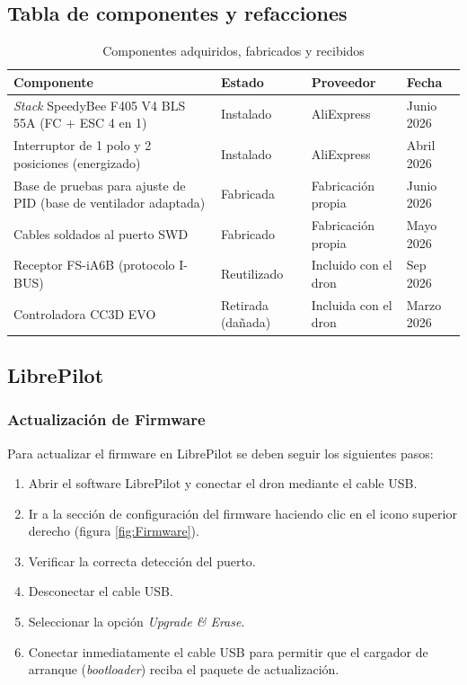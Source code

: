 \documentclass[pdflatex,sn-mathphys-num]{sn-jnl}%
\begin{document}
\subsection{Tabla de componentes y refacciones \label{sec:TablaComponentes}}
\begin{table}[!h]
\centering
\caption{Componentes adquiridos, fabricados y recibidos}
\label{tab:componentes}
\begin{tabular}{p{4.6cm}p{2.2cm}p{2.2cm}p{1.8cm}}
\hline
Componente & Estado & Proveedor  & Fecha \\
\hline
\textit{Stack} SpeedyBee F405 V4 BLS 55A (FC + ESC 4 en 1) & Instalado & AliExpress  & Junio 2026 \\
Interruptor de 1 polo y 2 posiciones (energizado) & Instalado   & AliExpress & Abril 2026 \\
Base de pruebas para ajuste de PID (base de ventilador adaptada) & Fabricada & Fabricación propia  & Junio 2026 \\
Cables soldados al puerto SWD & Fabricado & Fabricación propia  & Mayo 2026 \\
Receptor FS-iA6B (protocolo I-BUS) & Reutilizado & Incluido con el dron  & Sep 2026 \\
Controladora CC3D EVO & Retirada (dañada) & Incluida con el dron  & Marzo 2026 \\
\hline
\end{tabular}
\end{table}
\newpage
\subsection{LibrePilot}
\subsubsection{Actualización de Firmware \label{sec:Firmware}}
Para actualizar el firmware en LibrePilot se deben seguir los siguientes pasos:
\begin{enumerate}
    \item Abrir el software LibrePilot y conectar el dron mediante el cable USB.
    \item Ir a la sección de configuración del firmware haciendo clic en el icono superior derecho (figura \ref{fig:Firmware}).
    \item Verificar la correcta detección del puerto.
    \item Desconectar el cable USB.
    \item Seleccionar la opción \textit{Upgrade \& Erase}.
    \item Conectar inmediatamente el cable USB para permitir que el cargador de arranque (\textit{bootloader}) reciba el paquete de actualización.
\end{enumerate}
\end{document}
